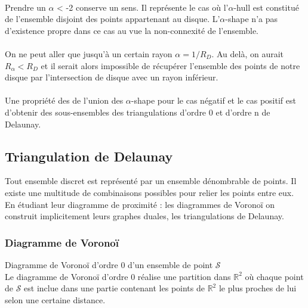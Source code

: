 \paragraph{}
Prendre un $\alpha$ < -2 conserve un sens. Il représente le cas où l'$\alpha$-hull est constitué de l'ensemble disjoint des points appartenant au disque. L'$\alpha$-shape n'a pas d'existence propre dans ce cas au vue la non-connexité de l'ensemble.

\paragraph{}
On ne peut aller que jusqu'à un certain rayon $\alpha = 1/R_D$. Au delà, on aurait $R_{\alpha} < R_D$ et il serait alors impossible de récupérer l'ensemble des points de notre disque par l'intersection de disque avec un rayon inférieur.

\paragraph{}
Une propriété \cite{EdeKirSei83} des de l'union des $\alpha$-shape pour le cas négatif et le cas positif est d'obtenir des sous-ensembles des triangulations d'ordre 0 et d'ordre n de Delaunay.  

\subsection{Triangulation de Delaunay}

Tout ensemble discret est représenté par un ensemble dénombrable de points. Il existe une multitude de combinaisons possibles pour relier les points entre eux. En étudiant leur diagramme de proximité : les diagrammes de Voronoï on construit implicitement leurs graphes duales, les triangulations de Delaunay.

\subsubsection{Diagramme de Voronoï}

\begin{Definition}{Diagramme de Voronoï d'ordre 0 d'un ensemble de point $\mathcal{S}$}\\
\label{def:tri-vor-0}
  Le diagramme de Voronoï d'ordre 0 réalise une partition dans $\mathbb{R}^2$ où chaque point de $\mathcal{S}$ est inclue dans une partie contenant les points de $\mathbb{R}^2$ le plus proches de lui selon une certaine distance.
\end{Definition}

